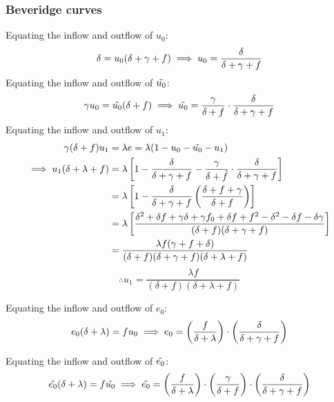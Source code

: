 \documentclass[12pt]{article} %
\theoremstyle{definition}
\begin{document}
\subsubsection{Beveridge curves}
Equating the inflow and outflow of $u_0$:
\begin{equation}
    \delta = u_0(\delta+\gamma+f) \\
    \implies u_0 = \frac{\delta}{\delta+\gamma+f}
\end{equation}
Equating the inflow and outflow of $\Tilde{u_0}$:
\begin{equation}
    \gamma u_0 = \Tilde{u_0}(\delta+f) \\
    \implies \Tilde{u_0} = \frac{\gamma}{\delta+f} \cdot \frac{\delta}{\delta+\gamma+f}
\end{equation}
Equating the inflow and outflow of $u_1$:
\begin{align*}
    \gamma (\delta + f)u_1 &= \lambda e = \lambda (1-u_0-\Tilde{u_0}-u_1)\\
    \implies u_1(\delta + \lambda + f) &= \lambda \left[ 1 -\frac{\delta}{\delta+\gamma+f} - \frac{\gamma}{\delta+\Tilde{f}} \cdot \frac{\delta}{\delta+\gamma+f}\right] \\
    &= \lambda \left[ 1 -\frac{\delta}{\delta+\gamma+f} \left(\frac{\delta+f+\gamma}{\delta+f}\right)\right] \\
     &= \lambda \left[ \frac{\delta^2 + \delta f + \gamma \delta + \gamma f_0 + \delta f + f^2 - \delta^2 - \delta f-\delta \gamma}{(\delta+f)(\delta+\gamma+f)} \right] \\
     &= \frac{\lambda f(\gamma + f +\delta)} {(\delta+f)(\delta+\gamma+f)(\delta + \lambda + f)} 
\end{align*}
\begin{equation}
    \therefore u_1 = \frac{\lambda f}{(\delta+f)(\delta + \lambda + f)} 
\end{equation}

Equating the inflow and outflow of $e_0$:
\begin{equation}
    e_0(\delta + \lambda) = f u_0 \\
    \implies e_0 = \left(\frac{f}{\delta+\lambda}\right) \cdot \left(\frac{\delta}{\delta+\gamma+f}\right) 
\end{equation}

Equating the inflow and outflow of $\Tilde{e_0}$:
\begin{equation}
    \Tilde{e_0}(\delta + \lambda) = f\Tilde{u_0} \\
    \implies \Tilde{e_0} = \left(\frac{f}{\delta+\lambda}\right) \cdot \left(\frac{\gamma}{\delta + f}\right) \cdot \left(\frac{\delta}{\delta+\gamma+f}\right) 
\end{equation}
\end{document}
